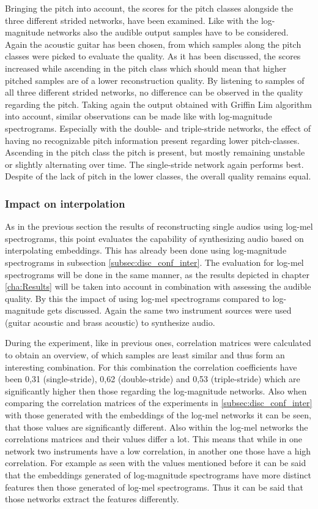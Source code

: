 Bringing the pitch into account, the scores for the pitch classes alongside the three different strided networks, have been examined. Like with the log-magnitude networks also the audible output samples have to be considered. Again the acoustic guitar has been chosen, from which samples along the pitch classes were picked to evaluate the quality. As it has been discussed, the scores increased while ascending in the pitch class which should mean that higher pitched samples are of a lower reconstruction quality. By listening to samples of all three different strided networks, no difference can be observed in the quality regarding the pitch. Taking again the output obtained with Griffin Lim algorithm into account, similar observations can be made like with log-magnitude spectrograms. Especially with the double- and triple-stride networks, the effect of having no recognizable pitch information present regarding lower pitch-classes. Ascending in the pitch class the pitch is present, but mostly remaining unstable or slightly alternating over time. The single-stride network again performs best. Despite of the lack of pitch in the lower classes, the overall quality remains equal.

\subsubsection{Impact on interpolation}
As in the previous section the results of reconstructing single audios using log-mel spectrograms, this point evaluates the capability of synthesizing audio based on interpolating embeddings. This has already been done using log-magnitude spectrograms in subsection \ref{subsec:disc_conf_inter}. The evaluation for log-mel spectrograms will be done in the same manner, as the results depicted in chapter \ref{cha:Results} will be taken into account in combination with assessing the audible quality. By this the impact of using log-mel spectrograms compared to log-magnitude gets discussed. Again the same two instrument sources were used (guitar acoustic and brass acoustic) to synthesize audio.

During the experiment, like in previous ones, correlation matrices were calculated to obtain an overview, of which samples are least similar and thus form an interesting combination. For this combination the correlation coefficients have been 0,31 (single-stride), 0,62 (double-stride) and 0,53 (triple-stride) which are significantly higher then those regarding the log-magnitude networks. Also when comparing the correlation matrices of the experiments in \ref{subsec:disc_conf_inter} with those generated with the embeddings of the log-mel networks it can be seen, that those values are significantly different. Also within the log-mel networks the correlations matrices and their values differ a lot. This means that while in one network two instruments have a low correlation, in another one those have a high correlation. 
For example as seen with the values mentioned before it can be said that the embeddings generated of log-magnitude spectrograms have more distinct features then those generated of log-mel spectrograms. Thus it can be said that those networks extract the features differently.

